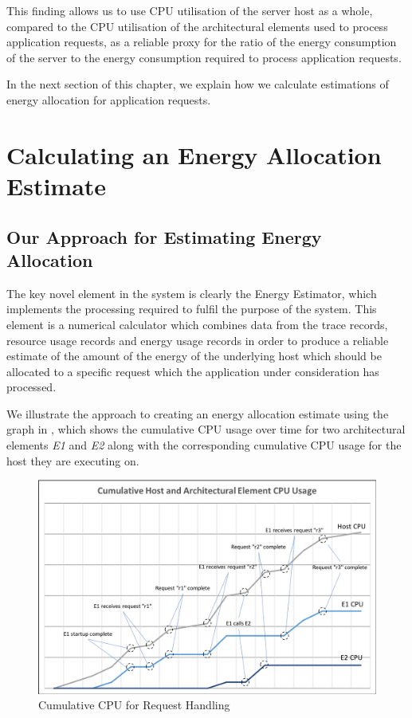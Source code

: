 This finding allows us to use CPU utilisation of the server host as a whole, compared to the CPU utilisation of the architectural elements used to process application requests, as a reliable proxy for the ratio of the energy consumption of the server to the energy consumption required to process application requests.

In the next section of this chapter, we explain how we calculate estimations of energy allocation for application requests.

\section{Calculating an Energy Allocation Estimate}

\subsection{Our Approach for Estimating Energy Allocation}

The key novel element in the system is clearly the Energy Estimator, which implements the processing required to fulfil the purpose of the system.  This element is a numerical calculator which combines data from the trace records, resource usage records and energy usage records in order to produce a reliable estimate of the amount of the energy of the underlying host which should be allocated to a specific request which the application under consideration has processed.

We illustrate the approach to creating an energy allocation estimate using the graph in , which shows the cumulative CPU usage over time for two architectural elements \emph{E1} and \emph{E2} along with the corresponding cumulative CPU usage for the host they are executing on.

\begin{figure}
\centering
\includegraphics[width=1.0\textwidth]{Figures/estimating-energy-cpuusage}
\caption{Cumulative CPU for Request Handling}
\label{figure:cpuusage}
\end{figure}

